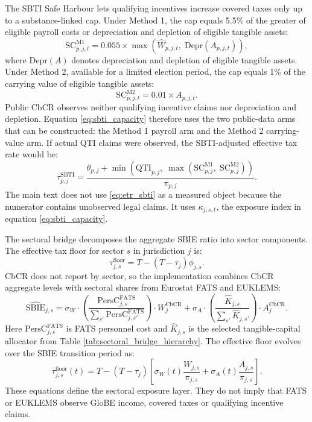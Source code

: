 \documentclass[11pt,a4paper]{article}
\begin{document}
The SBTI Safe Harbour lets qualifying incentives increase covered taxes only up to a substance-linked cap. Under Method 1, the cap equals 5.5\% of the greater of eligible payroll costs or depreciation and depletion of eligible tangible assets:
\begin{equation}\label{eq:substance_cap}
\text{SC}_{p,j,t}^{\text{M1}} = 0.055 \times \max\!\left(\hat{W}_{p,j,t},\; \text{Depr}(A_{p,j,t})\right),
\end{equation}
where $\text{Depr}(A)$ denotes depreciation and depletion of eligible tangible assets. Under Method 2, available for a limited election period, the cap equals 1\% of the carrying value of eligible tangible assets:
\begin{equation}\label{eq:substance_cap_m2}
\text{SC}_{p,j,t}^{\text{M2}} = 0.01 \times A_{p,j,t}.
\end{equation}
Public CbCR observes neither qualifying incentive claims nor depreciation and depletion. Equation \eqref{eq:sbti_capacity} therefore uses the two public-data arms that can be constructed: the Method 1 payroll arm and the Method 2 carrying-value arm. If actual QTI claims were observed, the SBTI-adjusted effective tax rate would be:
\begin{equation}\label{eq:etr_sbti}
\tau_{p,j}^{\text{SBTI}} = \frac{\theta_{p,j} + \min\!\left(\text{QTI}_{p,j},\; \max\!\left(\text{SC}_{p,j}^{\text{M1}},\; \text{SC}_{p,j}^{\text{M2}}\right)\right)}{\pi_{p,j}}.
\end{equation}
The main text does not use \eqref{eq:etr_sbti} as a measured object because the numerator contains unobserved legal claims. It uses $\kappa_{j,s,t}$, the exposure index in equation \eqref{eq:sbti_capacity}.

The sectoral bridge decomposes the aggregate SBIE ratio into sector components. The effective tax floor for sector $s$ in jurisdiction $j$ is:
\begin{equation}\label{eq:floor_sector}
\tau_{j,s}^{\text{floor}} = T - (T-\tau_j)\phi_{j,s}.
\end{equation}
CbCR does not report by sector, so the implementation combines CbCR aggregate levels with sectoral shares from Eurostat FATS and EUKLEMS:
\begin{equation}\label{eq:sbie_sectoral}
\widehat{\text{SBIE}}_{j,s} = \sigma_W \cdot \left(\frac{\text{PersC}_{j,s}^{\text{FATS}}}{\sum_{s'} \text{PersC}_{j,s'}^{\text{FATS}}}\right) \cdot W_j^{\text{CbCR}} + \sigma_A \cdot \left(\frac{\hat{K}_{j,s}}{\sum_{s'} \hat{K}_{j,s'}}\right) \cdot A_j^{\text{CbCR}}.
\end{equation}
Here $\text{PersC}_{j,s}^{\text{FATS}}$ is FATS personnel cost and $\hat{K}_{j,s}$ is the selected tangible-capital allocator from Table \ref{tab:sectoral_bridge_hierarchy}. The effective floor evolves over the SBIE transition period as:
\begin{equation}\label{eq:floor_transition}
\tau_{j,s}^{\text{floor}}(t) = T - (T-\tau_j)\left[\sigma_W(t)\frac{W_{j,s}}{\pi_{j,s}} + \sigma_A(t)\frac{A_{j,s}}{\pi_{j,s}}\right].
\end{equation}
These equations define the sectoral exposure layer. They do not imply that FATS or EUKLEMS observe GloBE income, covered taxes or qualifying incentive claims.
\end{document}
